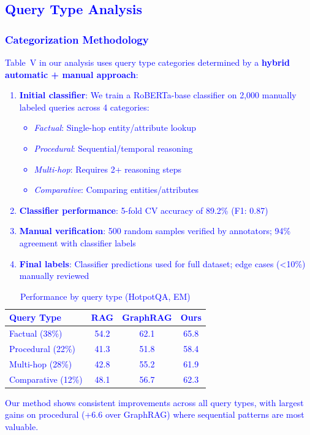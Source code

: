 \documentclass[10pt,twocolumn]{article}
\newcommand{\revision}[1]{\textcolor{blue}{#1}}
\begin{document}
\revision{
\subsection{Query Type Analysis}
\label{sec:query_types}

\subsubsection{Categorization Methodology}

Table~V in our analysis uses query type categories determined by a \textbf{hybrid automatic + manual approach}:

\begin{enumerate}
    \item \textbf{Initial classifier}: We train a RoBERTa-base classifier on 2,000 manually labeled queries across 4 categories:
    \begin{itemize}
        \item \textit{Factual}: Single-hop entity/attribute lookup
        \item \textit{Procedural}: Sequential/temporal reasoning
        \item \textit{Multi-hop}: Requires 2+ reasoning steps
        \item \textit{Comparative}: Comparing entities/attributes
    \end{itemize}
    
    \item \textbf{Classifier performance}: 5-fold CV accuracy of 89.2\% (F1: 0.87)
    
    \item \textbf{Manual verification}: 500 random samples verified by annotators; 94\% agreement with classifier labels
    
    \item \textbf{Final labels}: Classifier predictions used for full dataset; edge cases (<10\%) manually reviewed
\end{enumerate}

\begin{table}[h]
\centering
\caption{Performance by query type (HotpotQA, EM)}
\label{tab:query_type_perf}
\small
\begin{tabular}{@{}lccc@{}}
\toprule
\textbf{Query Type} & \textbf{RAG} & \textbf{GraphRAG} & \textbf{Ours} \\
\midrule
Factual (38\%) & 54.2 & 62.1 & 65.8 \\
Procedural (22\%) & 41.3 & 51.8 & 58.4 \\
Multi-hop (28\%) & 42.8 & 55.2 & 61.9 \\
Comparative (12\%) & 48.1 & 56.7 & 62.3 \\
\bottomrule
\end{tabular}
\end{table}

Our method shows consistent improvements across all query types, with largest gains on procedural (+6.6 over GraphRAG) where sequential patterns are most valuable.
}
\end{document}

